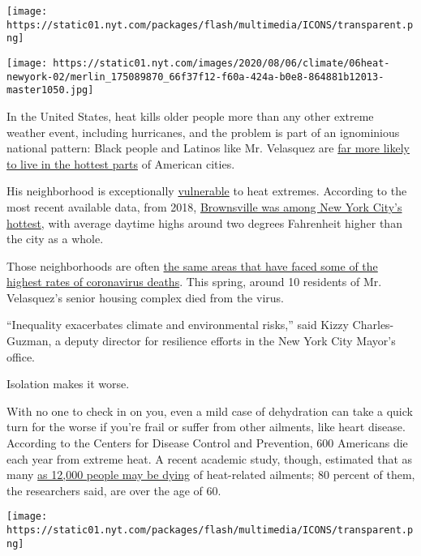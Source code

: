 \texttt{[image: https://static01.nyt.com/packages/flash/multimedia/ICONS/transparent.png]}

\texttt{[image: https://static01.nyt.com/images/2020/08/06/climate/06heat-newyork-02/merlin\_175089870\_66f37f12-f60a-424a-b0e8-864881b12013-master1050.jpg]}

In the United States, heat kills older people more than any other
extreme weather event, including hurricanes, and the problem is part of
an ignominious national pattern: Black people and Latinos like Mr.
Velasquez are \href{https://ehp.niehs.nih.gov/doi/10.1289/ehp.1205919}{}
\href{https://ehp.niehs.nih.gov/doi/10.1289/ehp.1205919}{far more likely
to live in the hottest parts} of American cities.

His neighborhood is exceptionally
\href{http://a816-dohbesp.nyc.gov/IndicatorPublic/HeatHub/hvi.html}{}
\href{http://a816-dohbesp.nyc.gov/IndicatorPublic/HeatHub/hvi.html}{vulnerable}
to heat extremes. According to the most recent available data, from
2018,
\href{http://a816-dohbesp.nyc.gov/IndicatorPublic/VisualizationData.aspx?id=2141,719b87,107,Summarize}{}
\href{http://a816-dohbesp.nyc.gov/IndicatorPublic/VisualizationData.aspx?id=2141,719b87,107,Summarize}{Brownsville
was among New York City's hottest}, with average daytime highs around
two degrees Fahrenheit higher than the city as a whole.

Those neighborhoods are often
\href{http://a816-dohbesp.nyc.gov/IndicatorPublic/HeatHub/hvi.html}{the
same areas that have faced some of the highest rates of coronavirus
deaths}. This spring, around 10 residents of Mr. Velasquez's senior
housing complex died from the virus.

``Inequality exacerbates climate and environmental risks,'' said Kizzy
Charles-Guzman, a deputy director for resilience efforts in the New York
City Mayor's office.

Isolation makes it worse.

With no one to check in on you, even a mild case of dehydration can take
a quick turn for the worse if you're frail or suffer from other
ailments, like heart disease. According to the Centers for Disease
Control and Prevention, 600 Americans die each year from extreme heat. A
recent academic study, though, estimated that as many
\href{https://www.climatecentral.org/news/2020-Heat-and-Seniors}{as
12,000 people may be dying} of heat-related ailments; 80 percent of
them, the researchers said, are over the age of 60.

\texttt{[image: https://static01.nyt.com/packages/flash/multimedia/ICONS/transparent.png]}

